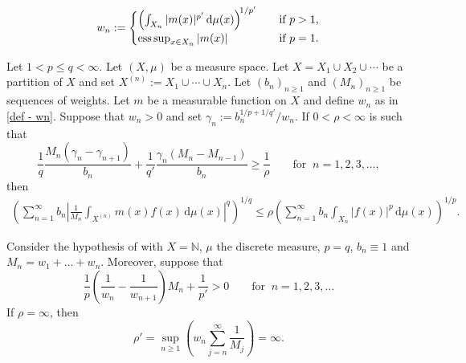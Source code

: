 \documentclass[10pt,a4paper]{amsart}
\begin{document}
\begin{equation}\label{def - wn}
    w_n := \begin{cases}
        \left( \int_{X_n} |m(x)|^{p'}\,\mathrm{d}\mu(x) \right)^{\!\smash{1/p'}} \quad&\text{if }p>1,\\
        \operatorname*{ess\,sup}_{x \in X_n} |m(x)|\quad&\text{if }p=1.
    \end{cases}
\end{equation}

\begin{thm}\label{thm - main}
    Let $1< p\leq q<\infty$. Let $(X,\mu)$ be a measure space. Let $X = X_1 \cup X_2 \cup \cdots$ be a partition of $X$ and set $X^{(n)} := X_1 \cup \cdots \cup X_n$. Let $(b_n)_{n\geq 1}$ and $(M_n)_{n\geq 1}$ be sequences of weights. Let $m$ be a measurable function on $X$ and define $w_n$ as in \eqref{def - wn}. Suppose that $w_n>0$ and set $\gamma_n:=b_n^{1/p+1/q'}\!\!/w_n$. If $0<\rho<\infty$ is such that
    \[
    \frac{1}{q}\frac{M_n(\gamma_n-\gamma_{n+1})}{b_n}
    +\frac{1}{q'}\frac{\gamma_n(M_n-M_{n-1})}{b_n}
    \geq
    \frac{1}{\rho}
    \qquad \text{for }~ n=1,2,3,\dots,
    \]
    then
    \begin{align*}
        \left(
        \sum_{n = 1}^\infty b_n
        \left| \frac{1}{M_n} \int_{X^{(n)}} m (x) f (x)
        \,\mathrm{d}\mu (x) \right|^q
        \right)^{\!\!1/q}
        \leq
        \rho
        \left(
        \sum_{n = 1}^\infty b_n \int_{X_n} |f (x)|^p
        \,\mathrm{d}\mu (x)
        \right)^{\!\!1/p}.
    \end{align*}
\end{thm}

\begin{prop}\label{prop - infty}
    Consider the hypothesis of  with $X=\mathbb{N}$, $\mu$ the discrete measure, $p=q$, $b_n\equiv 1$ and $M_n=w_1+\dots+w_n$. Moreover, suppose that 
    \begin{equation}
        \frac{1}{p}\left(\frac{1}{w_n}-\frac{1}{w_{n+1}}\right)\!M_n+\frac{1}{p'} > 0 \qquad \text{for }~ n=1,2,3,\dots %
    \end{equation}
    If $\rho=\infty$, then 
    \[
    \rho' = \sup_{n\geq 1} \left( w_n \sum_{j=n}^{\infty} \frac{1}{M_j} \right) = \infty.
    \]
\end{prop}
\end{document}
